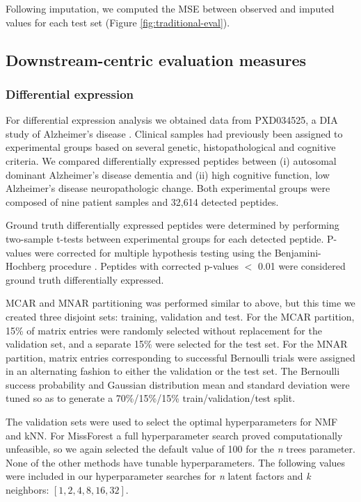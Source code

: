 \documentclass{article}
\begin{document}
Following imputation, we computed the MSE between observed and imputed values for each test set (Figure \ref{fig:traditional-eval}).

\subsection{Downstream-centric evaluation measures}

\subsubsection{Differential expression}

For differential expression analysis we obtained data from PXD034525, a DIA study of Alzheimer's disease \cite{smtg-maccoss}. Clinical samples had previously been assigned to experimental groups based on several genetic, histopathological and cognitive criteria. We compared differentially expressed peptides between (i) autosomal dominant Alzheimer's disease dementia and (ii) high cognitive function, low Alzheimer's disease neuropathologic change. Both experimental groups were composed of nine patient samples and 32,614 detected peptides. 

Ground truth differentially expressed peptides were determined by performing two-sample t-tests between experimental groups for each detected peptide. P-values were corrected for multiple hypothesis testing using the Benjamini-Hochberg procedure \cite{bj-fdr}. Peptides with corrected p-values $<$ 0.01 were considered ground truth differentially expressed.

MCAR and MNAR partitioning was performed similar to above, but this time we created three disjoint sets: training, validation and test. For the MCAR partition, 15\% of matrix entries were randomly selected without replacement for the validation set, and a separate 15\% were selected for the test set. For the MNAR partition, matrix entries corresponding to successful Bernoulli trials were assigned in an alternating fashion to either the validation or the test set. The Bernoulli success probability and Gaussian distribution mean and standard deviation were tuned so as to generate a 70\%/15\%/15\% train/validation/test split.

The validation sets were used to select the optimal hyperparameters for NMF and kNN. For MissForest a full hyperparameter search proved computationally unfeasible, so we again selected the default value of 100 for the \textit{n} trees parameter. None of the other methods have tunable hyperparameters. The following values were included in our hyperparameter searches for \textit{n} latent factors and \textit{k} neighbors: $[1,2,4,8,16,32]$.
\end{document}
